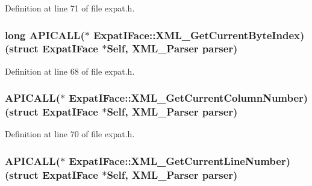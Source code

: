 Definition at line 71 of file expat.\+h.

\subsubsection[{\texorpdfstring{X\+M\+L\+\_\+\+Get\+Current\+Byte\+Index}{XML_GetCurrentByteIndex}}]{\setlength{\rightskip}{0pt plus 5cm}long A\+P\+I\+C\+A\+LL($\ast$ Expat\+I\+Face\+::\+X\+M\+L\+\_\+\+Get\+Current\+Byte\+Index) (struct {\bf Expat\+I\+Face} $\ast$Self, {\bf X\+M\+L\+\_\+\+Parser} parser)}\hypertarget{struct_expat_i_face_a6d8850369257e8348552789fb5a92df5}{}\label{struct_expat_i_face_a6d8850369257e8348552789fb5a92df5}


Definition at line 68 of file expat.\+h.

\subsubsection[{\texorpdfstring{X\+M\+L\+\_\+\+Get\+Current\+Column\+Number}{XML_GetCurrentColumnNumber}}]{ A\+P\+I\+C\+A\+LL($\ast$ Expat\+I\+Face\+::\+X\+M\+L\+\_\+\+Get\+Current\+Column\+Number) (struct {\bf Expat\+I\+Face} $\ast$Self, {\bf X\+M\+L\+\_\+\+Parser} parser)}\hypertarget{struct_expat_i_face_ac527027081ecfc8361e565a9a969daf7}{}\label{struct_expat_i_face_ac527027081ecfc8361e565a9a969daf7}


Definition at line 70 of file expat.\+h.

\subsubsection[{\texorpdfstring{X\+M\+L\+\_\+\+Get\+Current\+Line\+Number}{XML_GetCurrentLineNumber}}]{ A\+P\+I\+C\+A\+LL($\ast$ Expat\+I\+Face\+::\+X\+M\+L\+\_\+\+Get\+Current\+Line\+Number) (struct {\bf Expat\+I\+Face} $\ast$Self, {\bf X\+M\+L\+\_\+\+Parser} parser)}\hypertarget{struct_expat_i_face_af8cd14ded76ebd23daabbd1c1a67cae1}{}\label{struct_expat_i_face_af8cd14ded76ebd23daabbd1c1a67cae1}


